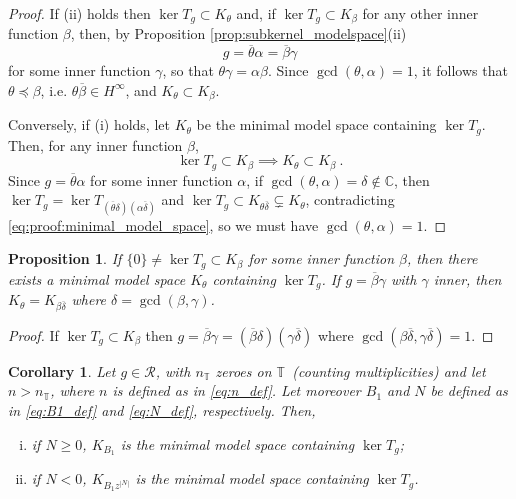 \documentclass{article}
\numberwithin{equation}{section}
\theoremstyle{plain}
\newtheorem{prop}[thm]{Proposition}
\newtheorem{cor}[thm]{Corollary}
\newcommand{\Hinf}{\ensuremath{H^\infty}}
\newcommand{\TT}{\ensuremath{\mathbb{T}}}
\newcommand{\CC}{\ensuremath{\mathbb{C}}}
\newcommand{\RR}{\ensuremath{\mathcal{R}}}
\newcommand{\ol}[1]{\ensuremath{\overline{#1}}}
\newcommand{\zero}{\ensuremath{\{0\}}}
\newcommand{\kertg}{\ensuremath{\ker T_g}}
\begin{document}
\begin{proof}
If (ii) holds then $\kertg \subset K_\theta$ and, if $\kertg \subset K_\beta$ for any other inner function $\beta$, then, by Proposition \ref{prop:subkernel_modelspace}(ii)
\begin{equation}
g = \ol\theta \alpha = \ol\beta \gamma
\end{equation}
for some inner function $\gamma$, so that $\theta \gamma = \alpha \beta$.
Since $\gcd (\theta, \alpha) = 1$, it follows that $\theta \preceq\beta$, i.e. $\theta\ol\beta\in\Hinf$, and $K_\theta \subset K_\beta$.

Conversely, if (i) holds, let $K_\theta$ be the minimal model space containing $\ker T_g$. Then, for any inner function $\beta$,
\begin{equation}
\label{eq:proof:minimal_model_space}
\kertg \subset K_\beta \implies K_\theta \subset K_\beta\ .
\end{equation}
Since $g= \ol\theta \alpha$ for some inner function $\alpha$, if $\gcd (\theta, \alpha) = \delta \notin\CC$, then $\kertg = \ker T_{(\ol\theta \delta) (\alpha \ol\delta)}$ and $\kertg \subset K_{\theta \ol\delta} \subsetneq K_\theta$, contradicting \eqref{eq:proof:minimal_model_space}, so we must have $\gcd (\theta, \alpha) = 1$.
\end{proof}


\begin{prop}
If $\zero \neq \kertg \subset K_\beta$ for some inner function $\beta$, then there exists a minimal model space $K_\theta$ containing \kertg.
If $g=\ol\beta \gamma$ with $\gamma$ inner, then $K_\theta = K_{\beta \ol\delta}$ where $\delta = \gcd (\beta, \gamma)$.
\end{prop}

\begin{proof}
If $\kertg \subset K_\beta$ then $g=\ol\beta \gamma = (\ol\beta \delta) (\gamma \ol\delta)$ where $\gcd (\beta \ol\delta, \gamma \ol\delta) = 1$.
\end{proof}


\begin{cor}
Let $g\in\RR$, with $n_\TT$ zeroes on \TT\ (counting multiplicities) and let $n>n_\TT$, where $n$ is defined as in \eqref{eq:n_def}.
Let moreover $B_1$ and $N$ be defined as in \eqref{eq:B1_def} and \eqref{eq:N_def}, respectively.
Then,
\begin{enumerate}[(i)]
\item if $N\geq 0$, $K_{B_1}$ is the minimal model space containing \kertg;

\item if $N<0$, $K_{B_1 z^{|N|}}$ is the minimal model space containing \kertg.
\end{enumerate}
\end{cor}
\end{document}
